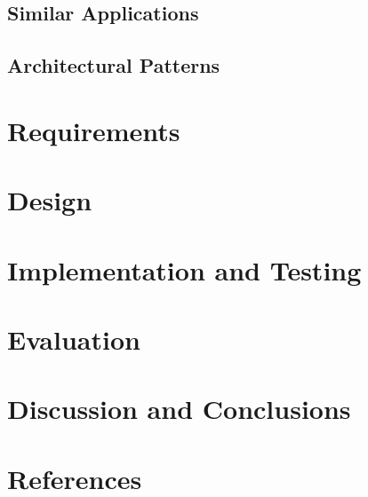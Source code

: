 \documentclass[12pt]{report}
\begin{document}
		\section{Similar Applications}
		\section{Architectural Patterns}
	\newpage

	\chapter{Requirements}

	\newpage	

	\chapter{Design}
	
	\newpage
	
	\chapter{Implementation and Testing}
	
	\newpage
	
	\chapter{Evaluation}
	
	\newpage
	
	\chapter{Discussion and Conclusions}
	
	\newpage	
	
	\chapter{References}
	
	\newpage
\end{document}
